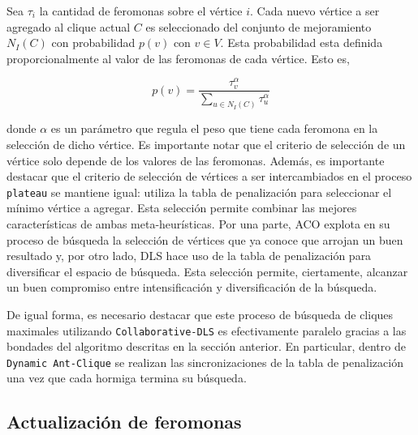 \documentclass[conference]{IEEEtran}
\begin{document}
Sea $\tau_i$ la cantidad de feromonas sobre el vértice $i$. Cada nuevo
vértice a ser agregado al clique actual $C$ es seleccionado del
conjunto de mejoramiento $N_I(C)$ con probabilidad $p(v)$ con $v \in
V$. Esta probabilidad esta definida proporcionalmente al valor de las
feromonas de cada vértice. Esto es,

$$p(v) = \frac{\tau_v^\alpha}{\sum_{u \in N_I(C)} \tau_u^\alpha}$$

donde $\alpha$ es un parámetro que regula el peso que tiene cada
feromona en la selección de dicho vértice. Es importante notar que el
criterio de selección de un vértice solo depende de los valores de las
feromonas. Además, es importante destacar que el criterio de selección
de vértices a ser intercambiados en el proceso \texttt{plateau} se
mantiene igual: utiliza la tabla de penalización para seleccionar el
mínimo vértice a agregar. Esta selección permite combinar las mejores
características de ambas meta-heurísticas. Por una parte, ACO explota
en su proceso de búsqueda la selección de vértices que ya conoce que
arrojan un buen resultado y, por otro lado, DLS hace uso de la tabla
de penalización para diversificar el espacio de búsqueda. Esta
selección permite, ciertamente, alcanzar un buen compromiso entre
intensificación y diversificación de la búsqueda.

De igual forma, es necesario destacar que este proceso de búsqueda de
cliques maximales utilizando \texttt{Collaborative-DLS} es
efectivamente paralelo gracias a las bondades del algoritmo descritas
en la sección anterior. En particular, dentro de \texttt{Dynamic
  Ant-Clique} se realizan las sincronizaciones de la tabla de
penalización una vez que cada hormiga termina su búsqueda.

\subsection{Actualización de feromonas}
\label{sec:aco:feromonas}
\end{document}
